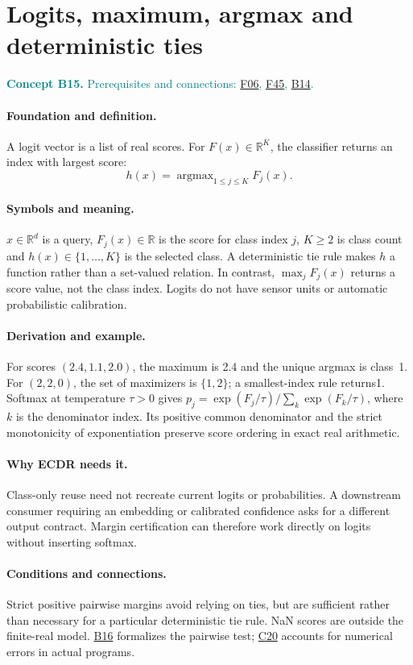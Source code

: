 \documentclass[11pt,a4paper]{article}
\newcommand{\R}{\mathbb R}
\newcommand{\conceptid}{Front matter}
\newcommand{\concept}[3]{\clearpage\renewcommand{\conceptid}{#1}%
\section{#2}\label{concept:#1}%
\textcolor{teal}{\textbf{Concept #1.} Prerequisites and connections: #3.}\par
\typeout{ECDR-CONCEPT-START #1 PAGE=\thepage}}
\begin{document}
\concept{B15}{Logits, maximum, argmax and deterministic ties}{\hyperref[concept:F06]{F06}, \hyperref[concept:F45]{F45}, \hyperref[concept:B14]{B14}}
\paragraph{Foundation and definition.}
A logit vector is a list of real scores. For $F(x)\in\R^K$, the classifier
returns an index with largest score:
\[
 h(x)=\operatorname{argmax}_{1\le j\le K}F_j(x).
\]
\paragraph{Symbols and meaning.}
$x\in\R^d$ is a query, $F_j(x)\in\R$ is the score for class index $j$,
$K\ge2$ is class count and $h(x)\in\{1,\ldots,K\}$ is the selected
class. A deterministic tie rule makes $h$ a function rather than a
set-valued relation. In contrast, $\max_jF_j(x)$ returns a score value,
not the class index. Logits do not have sensor units or automatic
probabilistic calibration.
\paragraph{Derivation and example.}
For scores $(2.4,1.1,2.0)$, the maximum is 2.4 and the unique argmax is
class~1. For $(2,2,0)$, the set of maximizers is $\{1,2\}$; a
smallest-index rule returns1. Softmax at temperature $\tau>0$ gives
$p_j=\exp(F_j/\tau)/\sum_k\exp(F_k/\tau)$, where $k$ is the denominator
index. Its positive common denominator and the strict monotonicity of
exponentiation preserve score ordering in exact real arithmetic.
\paragraph{Why ECDR needs it.}
Class-only reuse need not recreate current logits or probabilities. A
downstream consumer requiring an embedding or calibrated confidence asks
for a different output contract. Margin certification can therefore work
directly on logits without inserting softmax.
\paragraph{Conditions and connections.}
Strict positive pairwise margins avoid relying on ties, but are sufficient
rather than necessary for a particular deterministic tie rule. NaN scores
are outside the finite-real model. \hyperref[concept:B16]{B16} formalizes the pairwise test;
\hyperref[concept:C20]{C20} accounts for numerical errors in actual programs.
\par\label{endconcept:B15}
\end{document}
